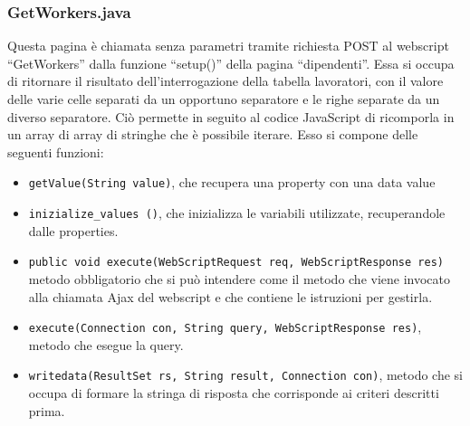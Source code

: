 \subsubsection{GetWorkers.java}
Questa pagina è chiamata senza parametri tramite richiesta POST al webscript “GetWorkers” dalla funzione “setup()” della pagina “dipendenti”. Essa si occupa di ritornare il risultato dell’interrogazione della tabella lavoratori, con il valore delle varie celle separati da un opportuno separatore e le righe separate da un diverso separatore. Ciò permette in seguito al codice JavaScript di ricomporla in un array di array di stringhe  che è possibile iterare.
Esso si compone delle seguenti funzioni:
\begin{itemize}
\item \texttt{getValue(String value)}, che recupera una property con una data value
\item \texttt{inizialize\_values ()}, che inizializza le variabili utilizzate, recuperandole dalle properties.
\item \texttt{public void execute(WebScriptRequest req, WebScriptResponse res)} metodo obbligatorio che si può intendere come il metodo che viene invocato alla chiamata Ajax del webscript e che contiene le istruzioni per gestirla.
\item \texttt{execute(Connection con, String query, WebScriptResponse res)}, metodo che esegue la query.
\item \texttt{writedata(ResultSet rs, String result, Connection con)}, metodo che si occupa di formare la stringa di risposta che corrisponde ai criteri descritti prima.
\end{itemize}
